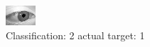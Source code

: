 \begin{figure}[h!]
\begin{center}
\includegraphics[width=0.60\columnwidth]{figures/ID2759_class_2_target_1.png}
\end{center}
\caption{ Classification: 2 actual target: 1}
\label{fig:ID2759_class_2_target_1}
\end{figure}
